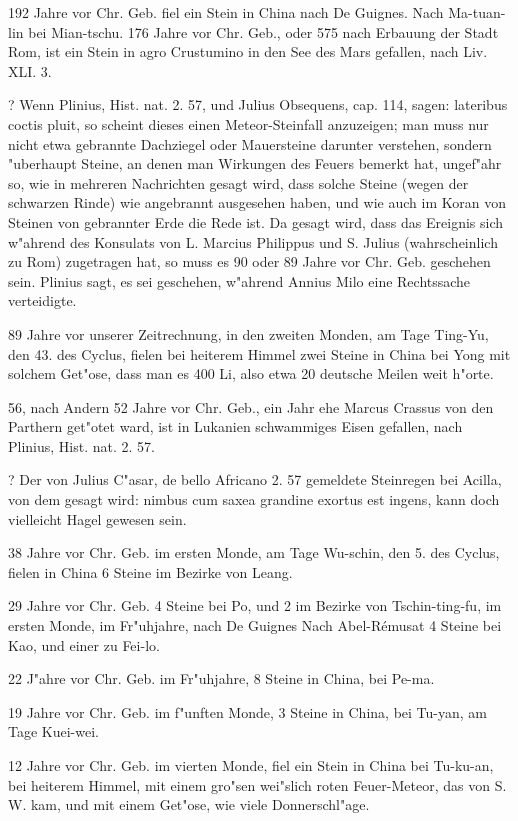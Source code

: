 \documentclass[a4paper, 11pt, oneside, polutonikogreek, german]{article}
\begin{document}
192 Jahre vor Chr. Geb. fiel ein Stein in China nach De Guignes. Nach Ma-tuan-lin bei Mian-tschu. 176 Jahre vor Chr. Geb., oder 575 nach Erbauung der Stadt Rom, ist ein Stein in agro Crustumino in den See des Mars gefallen, nach Liv. XLI. 3.

? Wenn Plinius, Hist. nat. 2. 57, und Julius Obsequens, cap. 114, sagen: lateribus coctis pluit, so scheint dieses einen Meteor-Steinfall anzuzeigen; man muss nur nicht etwa gebrannte Dachziegel oder Mauersteine darunter verstehen, sondern "uberhaupt Steine, an denen man Wirkungen des Feuers bemerkt hat, ungef"ahr so, wie in mehreren Nachrichten gesagt wird, dass solche Steine (wegen der schwarzen Rinde) wie angebrannt ausgesehen haben, und wie auch im Koran von Steinen von gebrannter Erde die Rede ist. Da gesagt wird, dass das Ereignis sich w"ahrend des Konsulats von L. Marcius Philippus und S. Julius (wahrscheinlich zu Rom) zugetragen hat, so muss es 90 oder 89 Jahre vor Chr. Geb. geschehen sein. Plinius sagt, es sei geschehen, w"ahrend Annius Milo eine Rechtssache verteidigte.

89 Jahre vor unserer Zeitrechnung, in den zweiten Monden, am Tage Ting-Yu, den 43. des Cyclus, fielen bei heiterem Himmel zwei Steine in China bei Yong mit solchem Get"ose, dass man es 400 Li, also etwa 20 deutsche Meilen weit h"orte.

56, nach Andern 52 Jahre vor Chr. Geb., ein Jahr ehe Marcus Crassus von den Parthern get"otet ward, ist in Lukanien schwammiges Eisen gefallen, nach Plinius, Hist. nat. 2. 57.

? Der von Julius C"asar, de bello Africano 2. 57 gemeldete Steinregen bei Acilla, von dem gesagt wird: nimbus cum saxea grandine exortus est ingens, kann doch vielleicht Hagel gewesen sein.

38 Jahre vor Chr. Geb. im ersten Monde, am Tage Wu-schin, den 5. des Cyclus, fielen in China 6 Steine im Bezirke von Leang.

29 Jahre vor Chr. Geb. 4 Steine bei Po, und 2 im Bezirke von Tschin-ting-fu, im ersten Monde, im Fr"uhjahre, nach De Guignes Nach Abel-Rémusat 4 Steine bei Kao, und einer zu Fei-lo.

22 J"ahre vor Chr. Geb. im Fr"uhjahre, 8 Steine in China, bei Pe-ma.

19 Jahre vor Chr. Geb. im f"unften Monde, 3 Steine in China, bei Tu-yan, am Tage Kuei-wei.

12 Jahre vor Chr. Geb. im vierten Monde, fiel ein Stein in China bei Tu-ku-an, bei heiterem Himmel, mit einem gro"sen wei"slich roten Feuer-Meteor, das von S. W. kam, und mit einem Get"ose, wie viele Donnerschl"age.
\end{document}
